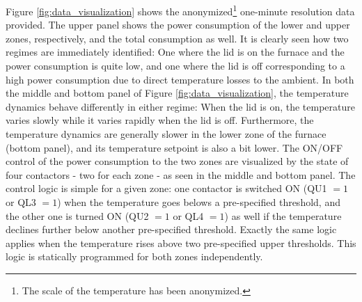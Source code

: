 \documentclass[lettersize,journal]{IEEEtran}
\begin{document}
Figure \ref{fig:data_visualization} shows the anonymized\footnote{The scale of the temperature has been anonymized.} one-minute resolution data provided. The upper panel shows the power consumption of the lower and upper zones, respectively, and the total consumption as well. It is clearly seen how two regimes are immediately identified: One where the lid is on the furnace and the power consumption is quite low, and one where the lid is off corresponding to a high power consumption due to direct temperature losses to the ambient. In both the middle and bottom panel of Figure \ref{fig:data_visualization}, the temperature dynamics behave differently in either regime: When the lid is on, the temperature varies slowly while it varies rapidly when the lid is off. Furthermore, the temperature dynamics are generally slower in the lower zone of the furnace (bottom panel), and its temperature setpoint is also a bit lower. The ON/OFF control of the power consumption to the two zones are visualized by the state of four contactors - two for each zone - as seen in the middle and bottom panel. The control logic is simple for a given zone: one contactor is switched ON (QU1 $=1$ or QL3 $=1$) when the temperature goes belows a pre-specified threshold, and the other one is turned ON (QU2 $=1$ or QL4 $=1$) as well if the temperature declines further below another pre-specified threshold. Exactly the same logic applies when the temperature rises above two pre-specified upper thresholds. This logic is statically programmed for both zones independently.
\end{document}
